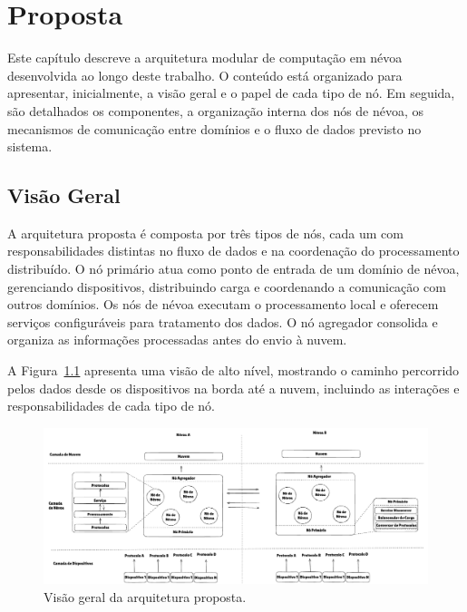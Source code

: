 \chapter{Proposta}\label{cap:proposta}

Este capítulo descreve a arquitetura modular de computação em névoa desenvolvida ao longo deste trabalho. O conteúdo está organizado para apresentar, inicialmente, a visão geral e o papel de cada tipo de nó. Em seguida, são detalhados os componentes, a organização interna dos nós de névoa, os mecanismos de comunicação entre domínios e o fluxo de dados previsto no sistema.

\section{Visão Geral}

A arquitetura proposta é composta por três tipos de nós, cada um com responsabilidades distintas no fluxo de dados e na coordenação do processamento distribuído. O nó primário atua como ponto de entrada de um domínio de névoa, gerenciando dispositivos, distribuindo carga e coordenando a comunicação com outros domínios. Os nós de névoa executam o processamento local e oferecem serviços configuráveis para tratamento dos dados. O nó agregador consolida e organiza as informações processadas antes do envio à nuvem.

A Figura~\ref{fig:arquitetura_proposta} apresenta uma visão de alto nível, mostrando o caminho percorrido pelos dados desde os dispositivos na borda até a nuvem, incluindo as interações e responsabilidades de cada tipo de nó.

\begin{figure}[htb]
    \caption{\label{fig:arquitetura_proposta}Visão geral da arquitetura proposta.}
    \begin{center}
        \includegraphics[width=1\linewidth]{images/arquitetura_proposta.png}
    \end{center}
\end{figure}

